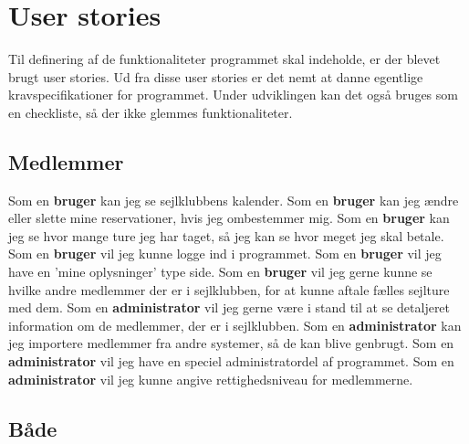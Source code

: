 \chapter{User stories}\label{User_stories}
Til definering af de funktionaliteter programmet skal indeholde, er der blevet brugt user stories.
Ud fra disse user stories er det nemt at danne egentlige kravspecifikationer for programmet. 
Under udviklingen kan det også bruges som en checkliste, så der ikke glemmes funktionaliteter. 

\section{Medlemmer}
Som en \textbf{bruger} kan jeg se sejlklubbens kalender.
\newline
Som en \textbf{bruger} kan jeg ændre eller slette mine reservationer, hvis jeg ombestemmer mig.
\newline
Som en \textbf{bruger} kan jeg se hvor mange ture jeg har taget, så jeg kan se hvor meget jeg skal betale.
\newline
Som en \textbf{bruger} vil jeg kunne logge ind i programmet.
\newline
Som en \textbf{bruger} vil jeg have en 'mine oplysninger' type side. 
\newline
Som en \textbf{bruger} vil jeg gerne kunne se hvilke andre medlemmer der er i sejlklubben, for at kunne aftale fælles sejlture med dem.
\newline
Som en \textbf{administrator} vil jeg gerne være i stand til at se detaljeret information om de medlemmer, der er i sejlklubben.
\newline
Som en \textbf{administrator} kan jeg importere medlemmer fra andre systemer, så de kan blive genbrugt.
\newline
Som en \textbf{administrator} vil jeg have en speciel administratordel af programmet.
\newline
Som en \textbf{administrator} vil jeg kunne angive rettighedsniveau for medlemmerne.

\section{Både}

